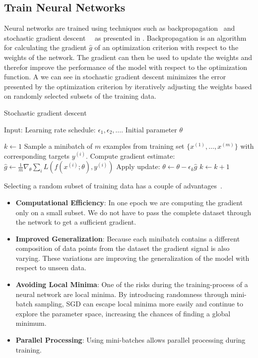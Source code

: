 \subsection{Train Neural Networks}

Neural networks are trained using techniques such as backpropagation~\cite{DL_Backpropagation} and stochastic gradient descent~\cite{SGD}~\cite{SGD2} as presented in . Backpropagation is an algorithm for calculating the gradient $\hat{g}$ of an optimization criterion with respect to the weights of the network. The gradient can then be used to update the weights and therefor improve the performance of the model with respect to the optimization function. A we can see in  stochastic gradient descent minimizes the error presented by the optimization criterion by iteratively adjusting the weights based on randomly selected subsets of the training data. 

\begin{algorithm}
    \caption{Stochastic gradient descent}\label{alg:SGD}
    \begin{algorithmic}
        \State{} Input: Learning rate schedule: $\epsilon_1, \epsilon_2, \ldots$. Initial parameter $\theta$

        \State{} $k \leftarrow 1$
            \State{} Sample a minibatch of $m$ examples from training set $\{x^{(1)}, \ldots, x^{(m)}\}$ with corresponding targets $y^{(i)}$.
            \State{} Compute gradient estimate:
            \State{} $\hat{g} \leftarrow \frac{1}{m}\nabla_\theta \sum_i L(f(x^{(i)}; \theta), y^{(i)})$
            \State{} Apply update:
            \State{} $\theta \leftarrow \theta - \epsilon_k \hat{g}$
            \State{} $k \leftarrow k + 1$
        \EndWhile{}
\end{algorithmic}
\end{algorithm} 

Selecting a random subset of training data has a couple of advantages~\cite{SAG_overview}. 
\begin{itemize}
	\item \textbf{Computational Efficiency}: In one epoch we are computing the gradient only on a small subset. We do not have to pass the complete dataset through the network to get a sufficient gradient.
	\item \textbf{Improved Generalization}: Because each minibatch contains a different composition of data points from the dataset the gradient signal is also varying. These variations are improving the generalization of the model with respect to unseen data.
	\item \textbf{Avoiding Local Minima}: One of the risks during the training-process of a neural network are local minima. By introducing randomness through mini-batch sampling, SGD can escape local minima more easily and continue to explore the parameter space, increasing the chances of finding a global minimum.
	\item \textbf{Parallel Processing}: Using mini-batches allows parallel processing during training. 
\end{itemize}

